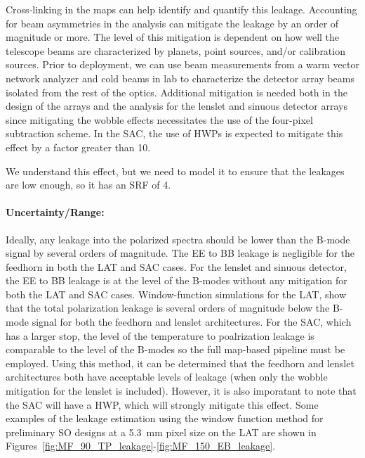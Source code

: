 Cross-linking in the maps can help identify and quantify this leakage. Accounting for beam asymmetries in the analysis can mitigate the leakage by an order of magnitude or more. The level of this mitigation is dependent on how well the telescope beams are characterized by planets, point sources, and/or calibration sources. Prior to deployment, we can use beam measurements from a warm vector network analyzer and cold beams in lab to characterize the detector array beams isolated from the rest of the optics. Additional mitigation is needed both in the design of the arrays and the analysis for the lenslet and sinuous detector arrays since mitigating the wobble effects necessitates the use of the four-pixel subtraction scheme. In the SAC, the use of HWPs is expected to mitigate this effect by a factor greater than 10.

We understand this effect, but we need to model it to ensure that the leakages are low enough, so it has an SRF of 4.

\paragraph{Uncertainty/Range:}
Ideally, any leakage into the polarized spectra should be lower than the B-mode signal by several orders of magnitude. The EE to BB leakage is negligible for the feedhorn in both the LAT and SAC cases. For the lenslet and sinuous detector, the EE to BB leakage is at the level of the B-modes without any mitigation for both the LAT and SAC cases. Window-function simulations for the LAT, show that the total polarization leakage is several orders of magnitude below the B-mode signal for both the feedhorn and lenslet architectures. For the SAC, which has a larger stop, the level of the temperature to poalrization leakage is comparable to the level of the B-modes so the full map-based pipeline must be employed. Using this method, it can be determined that the feedhorn and lenslet architectures both have acceptable levels of leakage (when only the wobble mitigation for the lenslet is included). However, it is also imporatant to note that the SAC will have a HWP, which will strongly mitigate this effect. Some examples of the leakage estimation using the window function method for preliminary SO designs at a 5.3~mm pixel size on the LAT are shown in Figures~\ref{fig:MF_90_TP_leakage}-\ref{fig:MF_150_EB_leakage}.

